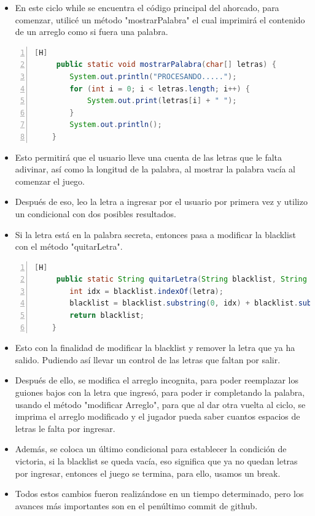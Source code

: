 \documentclass{article}
\begin{document}
	\begin{itemize}	
		\item En este ciclo while se encuentra el código principal del ahorcado, para comenzar, utilicé un método "mostrarPalabra" el cual imprimirá el contenido de un arreglo como si fuera una palabra. 
	\end{itemize}
	\begin{lstlisting}[language=java,caption={Mostrar palabra}, numbers=left][H]
	 public static void mostrarPalabra(char[] letras) {
        System.out.println("PROCESANDO.....");
        for (int i = 0; i < letras.length; i++) {
            System.out.print(letras[i] + " ");
        }
        System.out.println();
    }
	\end{lstlisting}
	\begin{itemize}	
		\item Esto permitirá que el usuario lleve una cuenta de las letras que le falta adivinar, así como la longitud de la palabra, al mostrar la palabra vacía al comenzar el juego.
		\item Después de eso, leo la letra a ingresar por el usuario por primera vez y utilizo un condicional con dos posibles resultados.
		\item Si la letra está en la palabra secreta, entonces pasa a modificar la blacklist con el método "quitarLetra".
	\end{itemize}
	\begin{lstlisting}[language=java,caption={Método quitar letra}, numbers=left][H]
	 public static String quitarLetra(String blacklist, String letra) {
        int idx = blacklist.indexOf(letra);
        blacklist = blacklist.substring(0, idx) + blacklist.substring(idx + 1);
        return blacklist;
    }
	\end{lstlisting}
	\begin{itemize}	
		\item Esto con la finalidad de modificar la blacklist y remover la letra que ya ha salido. Pudiendo así llevar un control de las letras que faltan por salir.
		\item Después de ello, se modifica el arreglo incognita, para poder reemplazar los guiones bajos con la letra que ingresó, para poder ir completando la palabra, usando el método "modificar Arreglo", para que al dar otra vuelta al ciclo, se imprima el arreglo modificado y el jugador pueda saber cuantos espacios de letras le falta por ingresar.
		\item Además, se coloca un último condicional para establecer la condición de victoria, si la blacklist se queda vacía, eso significa que ya no quedan letras por ingresar, entonces el juego se termina, para ello, usamos un break.
		\item Todos estos cambios fueron realizándose en un tiempo determinado, pero los avances más importantes son en el penúltimo commit de github.
	\end{itemize}
\end{document}
